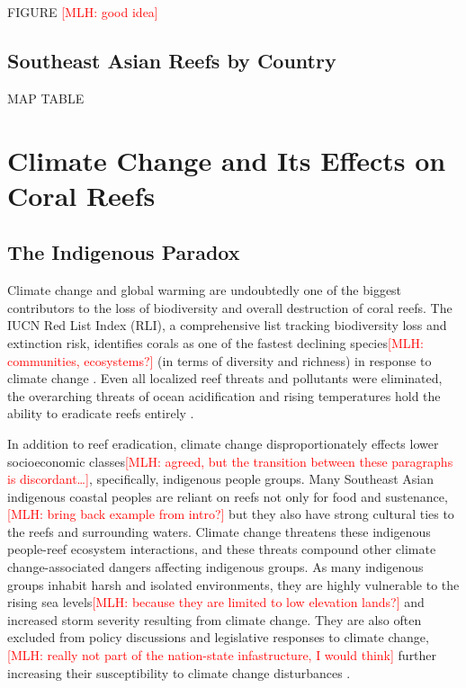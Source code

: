 \documentclass{book}\usepackage{knitr}
\newcommand{\red}[1]{\textcolor{red}{[MLH: #1]}}
\begin{document}
\begin{knitrout}
\begin{kframe}
{FIGURE \red{good idea}

\subsection{Southeast Asian Reefs by Country}

MAP
TABLE

\section{Climate Change and Its Effects on Coral Reefs}

\subsection{The Indigenous Paradox}

Climate change and global warming are undoubtedly one of the biggest contributors to the loss of biodiversity and overall destruction of coral reefs. The IUCN Red List Index (RLI), a comprehensive list tracking biodiversity loss and extinction risk, identifies corals as one of the fastest declining species\red{communities, ecosystems?} (in terms of diversity and richness) in response to climate change \citep{wwfindex}. Even all localized reef threats and pollutants were eliminated, the overarching threats of ocean acidification and rising temperatures hold the ability to eradicate reefs entirely \citep{Keller2009ClimateCC}.

In addition to reef eradication, climate change disproportionately effects lower socioeconomic classes\red{agreed, but the transition between these paragraphs is discordant\ldots}, specifically, indigenous people groups. Many Southeast Asian indigenous coastal peoples are reliant on reefs not only for food and sustenance,\red{bring back example from intro?} but they also have strong cultural ties to the reefs and surrounding waters. Climate change threatens these indigenous people-reef ecosystem interactions, and these threats compound other climate change-associated dangers affecting indigenous groups. As many indigenous groups inhabit harsh and isolated environments, they are highly vulnerable to the rising sea levels\red{because they are limited to low elevation lands?} and increased storm severity resulting from climate change. They are also often excluded from policy discussions and legislative responses to climate change,\red{really not part of the nation-state infastructure, I would think} further increasing their susceptibility to climate change disturbances \citep{13772149520190801}.

}
\end{kframe}
\end{knitrout}
\end{document}
